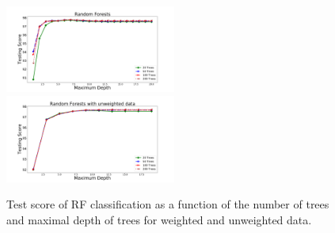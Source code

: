 \begin{figure}[h]
\hspace*{-0.5cm}
\includegraphics[width=0.5\textwidth]{plots/rf_train_weighted}
\hspace*{-0.5cm}
\includegraphics[width=0.5\textwidth]{plots/rf_train_unweighted}
\caption{
Test score of RF classification as a function of the number of trees and maximal depth of trees for weighted and unweighted data.
}
\label{fig:RF_complexity}
\end{figure}


